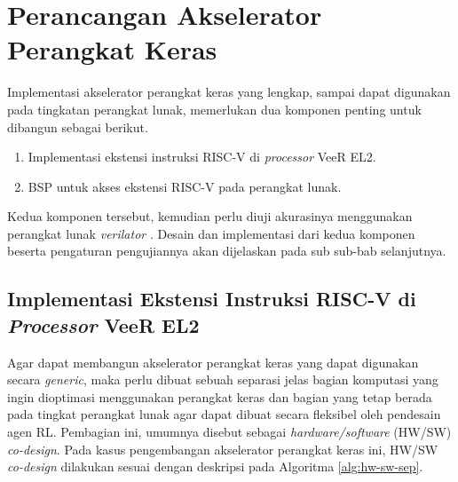 \section{Perancangan Akselerator Perangkat Keras}
\label{sec:perancangan-akselerator}

Implementasi akselerator perangkat keras yang lengkap, sampai dapat digunakan pada tingkatan perangkat lunak, memerlukan dua komponen penting untuk dibangun sebagai berikut.

\begin{enumerate}
	\item Implementasi ekstensi instruksi RISC-V di \textit{processor} VeeR EL2.
	\item \ac{BSP} untuk akses ekstensi RISC-V pada perangkat lunak.
\end{enumerate}

Kedua komponen tersebut, kemudian perlu diuji akurasinya menggunakan perangkat lunak \textit{verilator} \parencite{verilator2024github}. Desain dan implementasi dari kedua komponen beserta pengaturan pengujiannya akan dijelaskan pada sub sub-bab selanjutnya.

\subsection{Implementasi Ekstensi Instruksi RISC-V di \textit{Processor} VeeR EL2}

Agar dapat membangun akselerator perangkat keras yang dapat digunakan secara \textit{generic}, maka perlu dibuat sebuah separasi jelas bagian komputasi yang ingin dioptimasi menggunakan perangkat keras dan bagian yang tetap berada pada tingkat perangkat lunak agar dapat dibuat secara fleksibel oleh pendesain agen \ac{RL}. Pembagian ini, umumnya disebut sebagai \textit{hardware/software} (HW/SW) \textit{co-design}. Pada kasus pengembangan akselerator perangkat keras ini, HW/SW \textit{co-design} dilakukan sesuai dengan deskripsi pada Algoritma \ref{alg:hw-sw-sep}.

